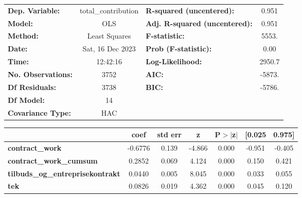 \begin{center}
\begin{tabular}{lclc}
\toprule
\textbf{Dep. Variable:}                     & total\_contribution & \textbf{  R-squared (uncentered):}      &     0.951   \\
\textbf{Model:}                             &         OLS         & \textbf{  Adj. R-squared (uncentered):} &     0.951   \\
\textbf{Method:}                            &    Least Squares    & \textbf{  F-statistic:       }          &     5553.   \\
\textbf{Date:}                              &   Sat, 16 Dec 2023  & \textbf{  Prob (F-statistic):}          &     0.00    \\
\textbf{Time:}                              &       12:42:16      & \textbf{  Log-Likelihood:    }          &    2950.7   \\
\textbf{No. Observations:}                  &          3752       & \textbf{  AIC:               }          &    -5873.   \\
\textbf{Df Residuals:}                      &          3738       & \textbf{  BIC:               }          &    -5786.   \\
\textbf{Df Model:}                          &            14       & \textbf{                     }          &             \\
\textbf{Covariance Type:}                   &         HAC         & \textbf{                     }          &             \\
\bottomrule
\end{tabular}
\begin{tabular}{lcccccc}
                                            & \textbf{coef} & \textbf{std err} & \textbf{z} & \textbf{P$> |$z$|$} & \textbf{[0.025} & \textbf{0.975]}  \\
\midrule
\textbf{contract\_work}                     &      -0.6776  &        0.139     &    -4.866  &         0.000        &       -0.951    &       -0.405     \\
\textbf{contract\_work\_cumsum}             &       0.2852  &        0.069     &     4.124  &         0.000        &        0.150    &        0.421     \\
\textbf{tilbuds\_og\_entreprisekontrakt}    &       0.0440  &        0.005     &     8.045  &         0.000        &        0.033    &        0.055     \\
\textbf{tek}                                &       0.0826  &        0.019     &     4.362  &         0.000        &        0.045    &        0.120     \\

\end{tabular}
\end{center}
